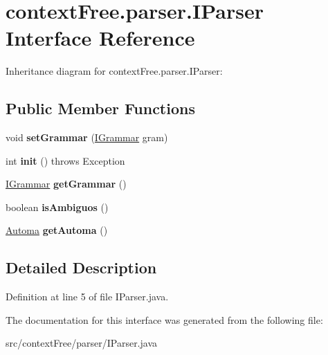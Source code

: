 \hypertarget{interfacecontext_free_1_1parser_1_1_i_parser}{\section{context\-Free.\-parser.\-I\-Parser Interface Reference}
\label{interfacecontext_free_1_1parser_1_1_i_parser}
}


Inheritance diagram for context\-Free.\-parser.\-I\-Parser\-:
\subsection*{Public Member Functions}
\begin{DoxyCompactItemize}
\item 
\hypertarget{interfacecontext_free_1_1parser_1_1_i_parser_aa0b56b8cc9bf60ddd02d5fb6a99d16bd}{void {\bfseries set\-Grammar} (\hyperlink{interfacecontext_free_1_1grammar_1_1_i_grammar}{I\-Grammar} gram)}\label{interfacecontext_free_1_1parser_1_1_i_parser_aa0b56b8cc9bf60ddd02d5fb6a99d16bd}

\item 
\hypertarget{interfacecontext_free_1_1parser_1_1_i_parser_a26c1dede13720e51bf04464b15ce1f01}{int {\bfseries init} ()  throws Exception}\label{interfacecontext_free_1_1parser_1_1_i_parser_a26c1dede13720e51bf04464b15ce1f01}

\item 
\hypertarget{interfacecontext_free_1_1parser_1_1_i_parser_a19a6f39c3ebc05c90845096a2b1c5889}{\hyperlink{interfacecontext_free_1_1grammar_1_1_i_grammar}{I\-Grammar} {\bfseries get\-Grammar} ()}\label{interfacecontext_free_1_1parser_1_1_i_parser_a19a6f39c3ebc05c90845096a2b1c5889}

\item 
\hypertarget{interfacecontext_free_1_1parser_1_1_i_parser_a29c662e040f218bfba40fb3e8c394615}{boolean {\bfseries is\-Ambiguos} ()}\label{interfacecontext_free_1_1parser_1_1_i_parser_a29c662e040f218bfba40fb3e8c394615}

\item 
\hypertarget{interfacecontext_free_1_1parser_1_1_i_parser_ad977787bef5bdc14b422945143a0414c}{\hyperlink{classcontext_free_1_1parser_1_1_automa}{Automa} {\bfseries get\-Automa} ()}\label{interfacecontext_free_1_1parser_1_1_i_parser_ad977787bef5bdc14b422945143a0414c}

\end{DoxyCompactItemize}


\subsection{Detailed Description}


Definition at line 5 of file I\-Parser.\-java.



The documentation for this interface was generated from the following file\-:\begin{DoxyCompactItemize}
\item 
src/context\-Free/parser/I\-Parser.\-java\end{DoxyCompactItemize}

